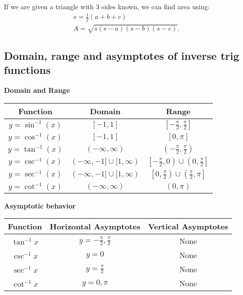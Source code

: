\documentclass{report}
\begin{document}
  \bigbreak \noindent \bigbreak \noindent
  If we are given a triangle with 3 sides known, we can find area using:
  \begin{align*}
    s = \frac{1}{2}(a+b+c) \\
    A = \sqrt{s(s-a)(s-b)(s-c)}
  .\end{align*}

  \pagebreak \bigbreak \noindent 
  \subsection{Domain, range and asymptotes of inverse trig functions}
  \bigbreak \noindent 
  \textbf{Domain and Range}
  \bigbreak \noindent 
  \begin{center}
    \begin{tabular}{|c|c|c|}
\hline
Function & Domain & Range \\
\hline
$y = \sin^{-1}(x)$ & $[-1, 1]$ & $\left[-\frac{\pi}{2}, \frac{\pi}{2}\right]$ \\
\hline
$y = \cos^{-1}(x)$ & $[-1, 1]$ & $[0, \pi]$ \\
\hline
$y = \tan^{-1}(x)$ & $(-\infty, \infty)$ & $\left(-\frac{\pi}{2}, \frac{\pi}{2}\right)$ \\
\hline
$y = \csc^{-1}(x)$ & $(-\infty, -1] \cup [1, \infty)$ & $\left[-\frac{\pi}{2}, 0\right) \cup \left(0, \frac{\pi}{2}\right]$ \\
\hline
$y = \sec^{-1}(x)$ & $(-\infty, -1] \cup [1, \infty)$ & $\left[0, \frac{\pi}{2}\right) \cup \left(\frac{\pi}{2}, \pi\right]$ \\
\hline
$y = \cot^{-1}(x)$ & $(-\infty, \infty)$ & $(0, \pi)$ \\
\hline
\end{tabular}
  \end{center}
  \bigbreak \noindent 
  \textbf{Asymptotic behavior}
  \bigbreak \noindent 
  \begin{center}

  \begin{tabular}{|c|c|c|}
\hline
Function & Horizontal Asymptotes  & Vertical Asymptotes \\
\hline
$\tan^{-1}{x}$ & $y=-\frac{\pi}{2},\frac{\pi}{2}$ & None \\
\hline
$\csc^{-1}{x}$ & $y=0$  & None \\
\hline
$\sec^{-1}{x}$ & $y=\frac{\pi}{2} $ &None \\
\hline
$\cot^{-1}{x}$ & $y=0,\pi $ & None \\
\hline
\end{tabular}
  \end{center}
  \bigbreak \noindent 
\end{document}

